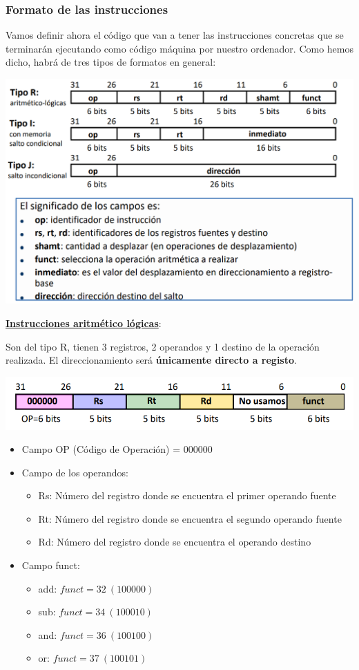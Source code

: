 \documentclass[a4paper,10pt]{book}
\begin{document}
\subsubsection*{Formato de las instrucciones}
Vamos definir ahora el código que van a tener las instrucciones concretas que se terminarán ejecutando como código máquina por nuestro ordenador. Como hemos dicho, habrá de tres tipos de formatos en general:
\begin{center}
\includegraphics[scale=0.6]{formatos instrucciones}
\end{center}

\underline{\textbf{Instrucciones aritmético lógicas}}:

Son del tipo R, tienen 3 registros, 2 operandos y 1 destino de la operación realizada. El direccionamiento será \textbf{únicamente directo a registo}.
\begin{center}
\includegraphics[scale=0.6]{instrucciones aritmetico_logicas}
\end{center}
\begin{itemize}
\item Campo OP (Código de Operación) = 000000
\item Campo de los operandos: 
	\begin{itemize}
	\item Rs: Número del registro donde se encuentra el primer operando fuente
	\item Rt: Número del registro donde se encuentra el segundo operando fuente
	\item Rd: Número del registro donde se encuentra el operando destino
	\end{itemize}

\item Campo funct:
	\begin{itemize}
	\item add: $funct=32 \ (100000)$
	\item sub: $funct=34 \ (100010)$
	\item and: $funct=36 \ (100100)$
	\item or: $funct=37 \ (100101)$
	\end{itemize}
\end{itemize}
\end{document}
